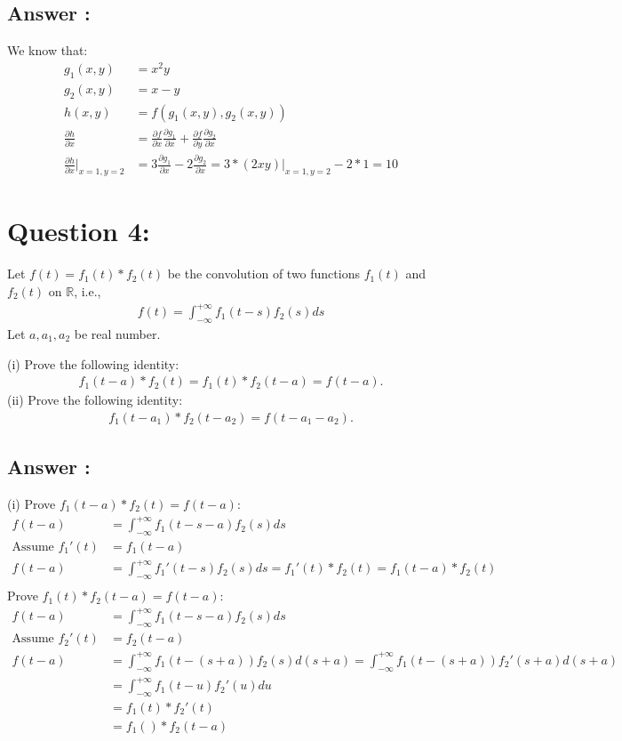 \documentclass[a4paper,12pt]{article}
\newcommand{\R}{\mathbb{R}}
\begin{document}
\subsection*{Answer :}
We know that:
\begin{align*}
    g_1(x, y) &= x^2y \\
    g_2(x, y) &= x - y \\
    h(x, y) &= f(g_1(x, y), g_2(x, y)) \\
    \frac{\partial h}{\partial x} &= \frac{\partial f}{\partial x} \frac{\partial g_1}{\partial x} + \frac{\partial f}{\partial y} \frac{\partial g_2}{\partial x} \\
    \frac{\partial h}{\partial x}|_{x=1, y=2} &= 3\frac{\partial g_1}{\partial x} -2\frac{\partial g_2}{\partial x} = 3 * (2xy)|_{x=1, y=2} - 2 * 1 = 10 
\end{align*}


\section*{Question 4:}
Let \(f(t) = f_1(t) * f_2(t)\) be the convolution of two functions \(f_1(t)\) and \(f_2(t)\) on \(\R\), i.e.,
\begin{align*}
    f(t) = \int_{-\infty}^{+\infty} f_1(t - s)f_2(s)ds
\end{align*}
Let \(a, a_1, a_2\) be real number.

(i) Prove the following identity:
\begin{align*}
    f_1(t-a)*f_2(t) = f_1(t) * f_2(t-a) = f(t-a).
\end{align*}
(ii) Prove the following identity:
\begin{align*}
    f_1(t-a_1) * f_2(t-a_2) = f(t-a_1-a_2).
\end{align*}


\subsection*{Answer :}
(i) 
Prove \(f_1(t - a) * f_2(t) = f(t - a)\):
\begin{align*}
    f(t - a) &= \int_{-\infty}^{+\infty}f_1(t - s - a)f_2(s)ds \\
    \text{Assume }f_1'(t) &= f_1(t - a) \\
    f(t - a) &= \int_{-\infty}^{+\infty}f_1'(t - s)f_2(s)ds = f_1'(t)*f_2(t) = f_1(t - a)*f_2(t) \\
\end{align*}
Prove \(f_1(t) * f_2(t - a) = f(t - a)\):
\begin{align*}
    f(t - a) &= \int_{-\infty}^{+\infty}f_1(t - s - a)f_2(s)ds \\
    \text{Assume }f_2'(t) &= f_2(t - a) \\
    f(t - a) &= \int_{-\infty}^{+\infty}f_1(t - (s+a))f_2(s)d(s + a) = \int_{-\infty}^{+\infty}f_1(t - (s+a))f_2'(s + a)d(s + a) \\
    &= \int_{-\infty}^{+\infty}f_1(t - u)f_2'(u)du \\
    &= f_1(t)*f_2'(t)  \\
    &= f_1()*f_2(t-a) \\
\end{align*}
\end{document}
